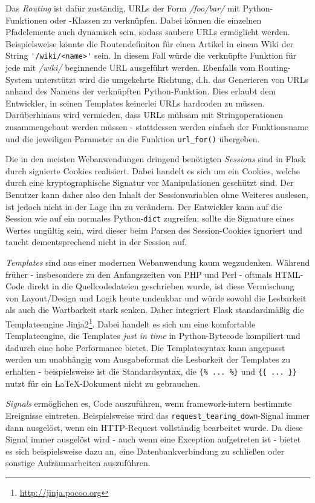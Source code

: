 Das \emph{Routing} ist dafür zuständig, URLs der Form \emph{/foo/bar/} mit Python-Funktionen oder
-Klassen zu verknüpfen. Dabei können die einzelnen Pfadelemente auch dynamisch sein, sodass saubere
URLs ermöglicht werden. Beispielsweise könnte die Routendefiniton für einen Artikel in einem
Wiki der String \lstinline{'/wiki/<name>'} sein. In diesem Fall würde die verknüpfte Funktion für
jede mit \emph{/wiki/} beginnende URL ausgeführt werden. Ebenfalls vom Routing-System unterstützt
wird die umgekehrte Richtung, d.h. das Generieren von URLs anhand des Namens der verknüpften
Python-Funktion. Dies erlaubt dem Entwickler, in seinen Templates keinerlei URLs hardcoden zu
müssen. Darüberhinaus wird vermieden, dass URLs mühsam mit Stringoperationen zusammengebaut werden
müssen - stattdessen werden einfach der Funktionsname und die jeweiligen Parameter an die Funktion
\lstinline{url_for()} übergeben.

Die in den meisten Webanwendungen dringend benötigten \emph{Sessions} sind in Flask durch signierte
Cookies realisiert. Dabei handelt es sich um ein Cookies, welche durch eine kryptographische
Signatur vor Manipulationen geschützt sind. Der Benutzer kann daher also den Inhalt der
Sessionvariablen ohne Weiteres auslesen, ist jedoch nicht in der Lage ihn zu verändern. Der
Entwickler kann auf die Session wie auf ein normales Python-\lstinline{dict} zugreifen; sollte die
Signature eines Wertes ungültig sein, wird dieser beim Parsen des Session-Cookies ignoriert und
taucht dementsprechend nicht in der Session auf.

\emph{Templates} sind aus einer modernen Webanwendung kaum wegzudenken. Während früher -
insbesondere zu den Anfangszeiten von PHP und Perl - oftmals HTML-Code direkt in die
Quellcodedateien geschrieben wurde, ist diese Vermischung von Layout/Design und Logik heute
undenkbar und würde sowohl die Lesbarkeit als auch die Wartbarkeit stark senken. Daher integriert
Flask standardmäßig die Templateengine
Jinja2\footnote{\href{http://jinja.pocoo.org}{http://jinja.pocoo.org}}. Dabei handelt es sich um
eine komfortable Templateengine, die Templates \emph{just in time} in Python-Bytecode kompiliert und
dadurch eine hohe Performance bietet. Die Templatesyntax kann angepasst werden um unabhängig vom
Ausgabeformat die Lesbarkeit der Templates zu erhalten - beispielsweise ist die Standardsyntax, die
\lstinline|{% ... %}| und \lstinline|{{ ... }}| nutzt für ein \LaTeX-Dokument nicht zu
gebrauchen.

\emph{Signals} ermöglichen es, Code auszuführen, wenn framework-intern bestimmte Ereignisse
eintreten. Beispielsweise wird das \lstinline{request_tearing_down}-Signal immer dann ausgelöst,
wenn ein HTTP-Request vollständig bearbeitet wurde. Da diese Signal immer ausgelöst wird - auch wenn
eine Exception aufgetreten ist - bietet es sich beispielsweise dazu an, eine Datenbankverbindung zu
schließen oder sonstige Aufräumarbeiten auszuführen.

